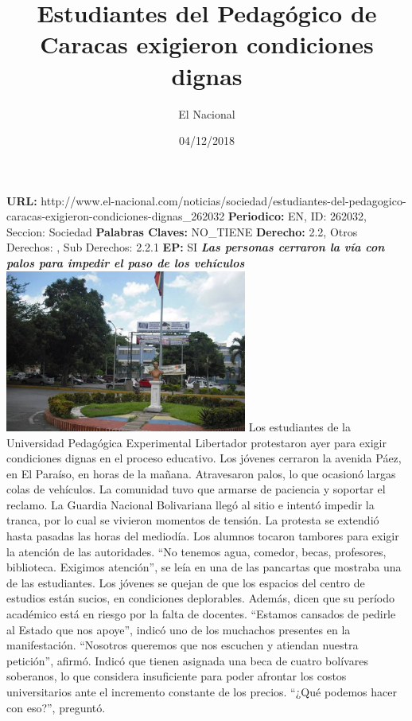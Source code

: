 \documentclass{article}%
\title{\textbf{Estudiantes del Pedagógico de Caracas exigieron condiciones dignas}}%
\author{El Nacional}%
\date{04/12/2018}%
\begin{document}
%
\normalsize%
\maketitle%
\textbf{URL: }%
http://www.el{-}nacional.com/noticias/sociedad/estudiantes{-}del{-}pedagogico{-}caracas{-}exigieron{-}condiciones{-}dignas\_262032\newline%
%
\textbf{Periodico: }%
EN, %
ID: %
262032, %
Seccion: %
Sociedad\newline%
%
\textbf{Palabras Claves: }%
NO\_TIENE\newline%
%
\textbf{Derecho: }%
2.2, %
Otros Derechos: %
, %
Sub Derechos: %
2.2.1\newline%
%
\textbf{EP: }%
SI\newline%
\newline%
%
\textbf{\textit{Las personas cerraron la vía con palos para impedir el paso de los vehículos}}%
\newline%
\newline%
%
\includegraphics[width=300px]{65.jpg}%
\newline%
%
Los estudiantes de la Universidad Pedagógica Experimental Libertador protestaron ayer para exigir condiciones dignas en el proceso educativo.%
\newline%
%
Los jóvenes cerraron la avenida Páez, en El Paraíso, en horas de la mañana. Atravesaron palos, lo que ocasionó largas colas de vehículos. La comunidad tuvo que armarse de paciencia y soportar el reclamo. La Guardia Nacional Bolivariana llegó al sitio e intentó impedir la tranca, por lo cual se vivieron momentos de tensión.%
\newline%
%
La protesta se extendió hasta pasadas las horas del mediodía. Los alumnos tocaron tambores para exigir la atención de las autoridades.%
\newline%
%
“No tenemos agua, comedor, becas, profesores, biblioteca. Exigimos atención”, se leía en una de las pancartas que mostraba una de las estudiantes.%
\newline%
%
Los jóvenes se quejan de que los espacios del centro de estudios están sucios, en condiciones deplorables. Además, dicen que su período académico está en riesgo por la falta de docentes.%
\newline%
%
“Estamos cansados de pedirle al Estado que nos apoye”, indicó uno de los muchachos presentes en la manifestación. “Nosotros queremos que nos escuchen y atiendan nuestra petición”, afirmó.%
\newline%
%
Indicó que tienen asignada una beca de cuatro bolívares soberanos, lo que considera insuficiente para poder afrontar los costos universitarios ante el incremento constante de los precios. “¿Qué podemos hacer con eso?”, preguntó.%
\newline%
%
\end{document}
